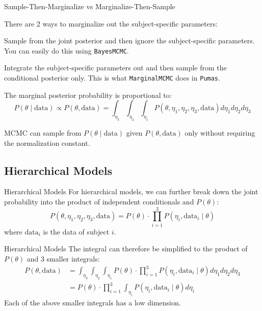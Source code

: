 \begin{frame}{Sample-Then-Marginalize vs Marginalize-Then-Sample}
	\begin{vfilleditems}
		\item There are 2 ways to marginalize out the subject-specific parameters:
			\begin{vfilleditems}
				\item Sample from the joint posterior and then ignore the subject-specific parameters. You can easily do this using \lstinline{BayesMCMC}.
				\item Integrate the subject-specific parameters out and then sample from the conditional posterior only. This is what \lstinline{MarginalMCMC} does in \lstinline{Pumas}.
			\end{vfilleditems}
		\item The marginal posterior probability is proportional to:
		$$
			P(\theta \mid \text{data}) \propto P(\theta, \text{data}) = \int_{\eta_3} \int_{\eta_2} \int_{\eta_1} P(\theta, \eta_1, \eta_2, \eta_3, \text{data}) d\eta_1 d\eta_2 d\eta_3
		$$
		\item MCMC can sample from $P(\theta \mid \text{data})$ given $P(\theta, \text{data})$ only without requiring the normalization constant.
	\end{vfilleditems}
\end{frame}

\subsection{Hierarchical Models}
\begin{frame}{Hierarchical Models}
    For hierarchical models, we can further break down the joint probability into the product of independent conditionals and $P(\theta)$:
	$$
		P(\theta, \eta_1, \eta_2, \eta_3, \text{data}) = P(\theta) \cdot \prod_{i=1}^3 P(\eta_i, \text{data}_i \mid \theta)
	$$
	where $\text{data}_i$ is the data of subject $i$.
\end{frame}

\begin{frame}{Hierarchical Models}
	The integral can therefore be simplified to the product of $P(\theta)$ and 3 smaller integrals:
	$$
		\begin{aligned}
			P(\theta, \text{data}) & = \int_{\eta_3} \int_{\eta_2} \int_{\eta_1} P(\theta) \cdot \prod_{i=1}^3 P(\eta_i, \text{data}_i \mid \theta) d\eta_1 d\eta_2 d\eta_3 \\
			& = P(\theta) \cdot \prod_{i=1}^3 \int_{\eta_i} P(\eta_i, \text{data}_i \mid \theta) d\eta_i
		\end{aligned}
	$$
	\vfill
	Each of the above smaller integrals has a low dimension.
\end{frame}


